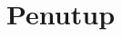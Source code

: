     \newpage

    {\centering
        \renewcommand{\thesection}{\arabic{section}.}
        \section{Penutup}
    }

